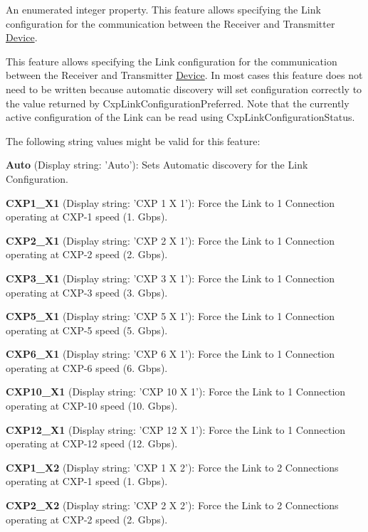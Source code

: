 An enumerated integer property. This feature allows specifying the Link configuration for the communication between the Receiver and Transmitter \hyperlink{classmv_i_m_p_a_c_t_1_1acquire_1_1_device}{Device}. 

This feature allows specifying the Link configuration for the communication between the Receiver and Transmitter \hyperlink{classmv_i_m_p_a_c_t_1_1acquire_1_1_device}{Device}. In most cases this feature does not need to be written because automatic discovery will set configuration correctly to the value returned by Cxp\+Link\+Configuration\+Preferred. Note that the currently active configuration of the Link can be read using Cxp\+Link\+Configuration\+Status.

The following string values might be valid for this feature\+:
\begin{DoxyItemize}
\item {\bfseries Auto} (Display string\+: 'Auto')\+: Sets Automatic discovery for the Link Configuration.
\item {\bfseries C\+X\+P1\+\_\+\+X1} (Display string\+: 'C\+X\+P 1 X 1')\+: Force the Link to 1 Connection operating at C\+X\+P-\/1 speed (1. Gbps).
\item {\bfseries C\+X\+P2\+\_\+\+X1} (Display string\+: 'C\+X\+P 2 X 1')\+: Force the Link to 1 Connection operating at C\+X\+P-\/2 speed (2. Gbps).
\item {\bfseries C\+X\+P3\+\_\+\+X1} (Display string\+: 'C\+X\+P 3 X 1')\+: Force the Link to 1 Connection operating at C\+X\+P-\/3 speed (3. Gbps).
\item {\bfseries C\+X\+P5\+\_\+\+X1} (Display string\+: 'C\+X\+P 5 X 1')\+: Force the Link to 1 Connection operating at C\+X\+P-\/5 speed (5. Gbps).
\item {\bfseries C\+X\+P6\+\_\+\+X1} (Display string\+: 'C\+X\+P 6 X 1')\+: Force the Link to 1 Connection operating at C\+X\+P-\/6 speed (6. Gbps).
\item {\bfseries C\+X\+P10\+\_\+\+X1} (Display string\+: 'C\+X\+P 10 X 1')\+: Force the Link to 1 Connection operating at C\+X\+P-\/10 speed (10. Gbps).
\item {\bfseries C\+X\+P12\+\_\+\+X1} (Display string\+: 'C\+X\+P 12 X 1')\+: Force the Link to 1 Connection operating at C\+X\+P-\/12 speed (12. Gbps).
\item {\bfseries C\+X\+P1\+\_\+\+X2} (Display string\+: 'C\+X\+P 1 X 2')\+: Force the Link to 2 Connections operating at C\+X\+P-\/1 speed (1. Gbps).
\item {\bfseries C\+X\+P2\+\_\+\+X2} (Display string\+: 'C\+X\+P 2 X 2')\+: Force the Link to 2 Connections operating at C\+X\+P-\/2 speed (2. Gbps).

\end{DoxyItemize}
